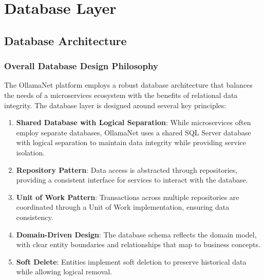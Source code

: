 \def\chapdir{./Chapter05}

\chapter{Database Layer} \label{ch:database-layer}

\section{Database Architecture}

\subsection{Overall Database Design Philosophy}

The OllamaNet platform employs a robust database architecture that balances the needs of a microservices ecosystem with the benefits of relational data integrity. The database layer is designed around several key principles:

\begin{enumerate}
   \item \textbf{Shared Database with Logical Separation}: While microservices often employ separate databases, OllamaNet uses a shared SQL Server database with logical separation to maintain data integrity while providing service isolation.

   \item \textbf{Repository Pattern}: Data access is abstracted through repositories, providing a consistent interface for services to interact with the database.

   \item \textbf{Unit of Work Pattern}: Transactions across multiple repositories are coordinated through a Unit of Work implementation, ensuring data consistency.

   \item \textbf{Domain-Driven Design}: The database schema reflects the domain model, with clear entity boundaries and relationships that map to business concepts.

   \item \textbf{Soft Delete}: Entities implement soft deletion to preserve historical data while allowing logical removal.
\end{enumerate}

